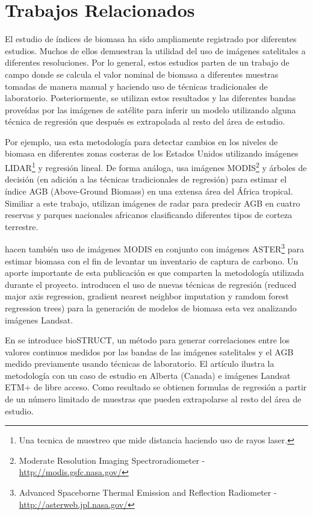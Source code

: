 \section{Trabajos Relacionados}

El estudio de índices de biomasa ha sido ampliamente registrado por diferentes estudios. Muchos de ellos demuestran la utilidad del uso de imágenes satelitales a diferentes resoluciones. Por lo general, estos estudios parten de un trabajo de campo donde se calcula el valor nominal de biomasa a diferentes muestras tomadas de manera manual y haciendo uso de técnicas tradicionales de laboratorio. Posteriormente, se utilizan estos resultados y las diferentes bandas proveídas por las imágenes de satélite para inferir un modelo utilizando alguna técnica de regresión que después es extrapolada al resto del área de estudio.

Por ejemplo, \cite{klemas2013remotesensing} usa esta metodología para detectar cambios en los niveles de biomasa en diferentes zonas costeras de los Estados Unidos utilizando imágenes LIDAR\footnote{Una tecnica de muestreo que mide distancia haciendo uso de rayos laser.} y regresión lineal. De forma análoga, \cite{baccini2008afirst} usa imágenes MODIS\footnote{Moderate Resolution Imaging Spectroradiometer  - \url{http://modis.gsfc.nasa.gov/}} y árboles de decisión (en adición a las técnicas tradicionales de regresión) para estimar el índice AGB (Above-Ground Biomass) en una extensa área del África tropical. Similiar a este trabajo, \cite{mitchard2009usingsatellite} utilizan imágenes de radar para predecir AGB en cuatro reservas y parques nacionales africanos clasificando diferentes tipos de corteza terrestre.

\cite{muukkonen2007biomass} hacen también uso de imágenes MODIS en conjunto con imágenes ASTER\footnote{Advanced Spaceborne Thermal Emission and Reflection Radiometer - \url{http://asterweb.jpl.nasa.gov/}} para estimar biomasa con el fin de levantar un inventario de captura de carbono. Un aporte importante de esta publicación es que comparten la metodología utilizada durante el proyecto. \cite{powell2010quantification} introducen el uso de nuevas técnicas de regresión (reduced major axis regression, gradient nearest neighbor imputation y ramdom forest regression trees) para la generación de modelos de biomasa esta vez analizando imágenes Landsat.

En \cite{hall2006modeling} se introduce bioSTRUCT, un método para generar correlaciones entre los valores continuos medidos por las bandas de las imágenes satelitales y el AGB medido previamente usando técnicas de laboratorio. El artículo ilustra la metodología con un caso de estudio en Alberta (Canada) e imágenes Landsat ETM+ de libre acceso. Como resultado se obtienen formulas de regresión a partir de un número limitado de muestras que pueden extrapolarse al resto del área de estudio.



